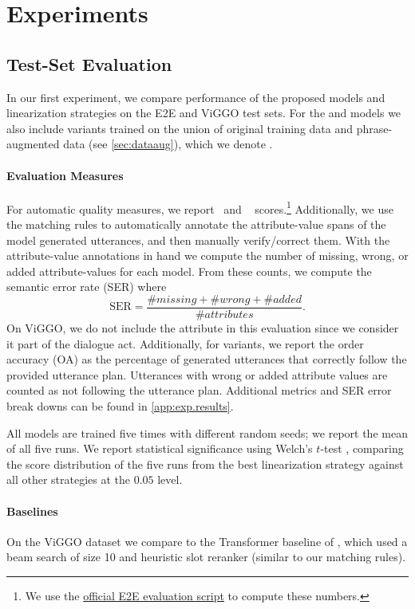 \section{Experiments}

\subsection{Test-Set Evaluation}

In our first experiment, we compare performance of the proposed models and
linearization strategies on the E2E and ViGGO test sets. For the 
and  models we also include variants trained on
the union of original training data and phrase-augmented data (see
\autoref{sec:dataaug}), which we denote \phraseAug.

\paragraph{Evaluation Measures} For automatic quality measures, we report
\bleu~and \rougel~\cite{lin2004} scores.\footnote{We use the
\href{https://github.com/tuetschek/e2e-metrics}{official E2E evaluation
script} to compute these numbers.} Additionally, we use the matching rules to
automatically annotate the attribute-value spans of the model generated
utterances, and then manually verify/correct them. With the attribute-value
annotations in hand we compute the number of missing, wrong, or added
attribute-values for each model. From these counts, we compute the semantic
error rate (SER) \cite{dusek2020} where \[ \textrm{SER} = \frac{\#missing +
\#wrong + \#added}{\#attributes}.\]  On ViGGO, we do not include the
 attribute in this evaluation since we consider it part of the
dialogue act.  Additionally, for  variants, we report the order
accuracy (OA) as the percentage of generated utterances that correctly follow
the provided utterance plan. Utterances with wrong or added attribute values
are counted as not following the utterance plan. Additional metrics
and SER error break downs can be found in \autoref{app:exp.results}.

All models are trained five times with different random seeds; we report
the mean of all five runs. We report statistical significance
using Welch's $t$-test \cite{welch1947}, comparing the score distribution of the five runs from the best linearization strategy against all other strategies
at the $0.05$ level.

\paragraph{Baselines} On the ViGGO dataset we compare to the Transformer
baseline of \citet{juraska2019}, which used a beam search of size 10 and
heuristic slot reranker (similar to our matching rules).



